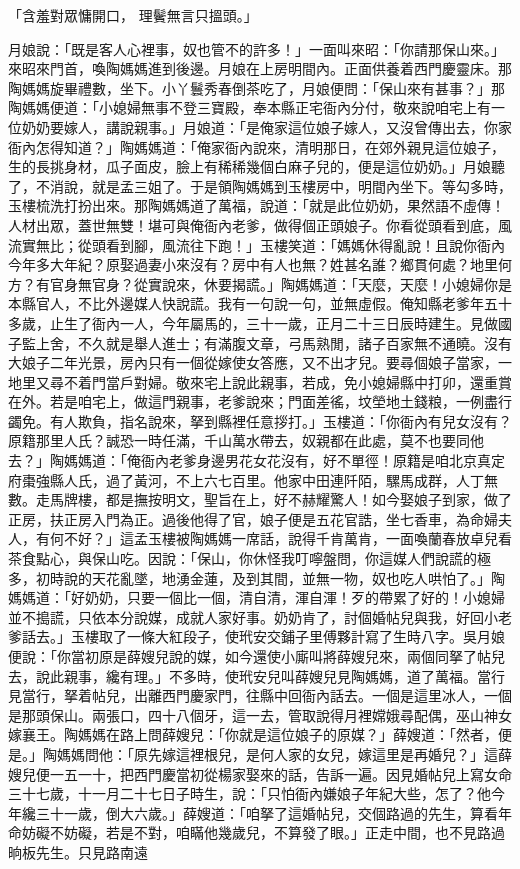 \begin{showcontents}{}
「含羞對眾慵開口，  理鬢無言只搵頭。」

月娘說：「既是客人心裡事，奴也管不的許多！」一面叫來昭：「你請那保山來。」來昭來門首，喚陶媽媽進到後邊。月娘在上房明間內。正面供養着西門慶靈床。那陶媽媽旋畢禮數，坐下。小丫鬟秀春倒茶吃了，月娘便問：「保山來有甚事？」那陶媽媽便道：「小媳婦無事不登三寶殿，奉本縣正宅衙內分付，敬來說咱宅上有一位奶奶要嫁人，講說親事。」月娘道：「是俺家這位娘子嫁人，又沒曾傳出去，你家衙內怎得知道？」陶媽媽道：「俺家衙內說來，清明那日，在郊外親見這位娘子，生的長挑身材，瓜子面皮，臉上有稀稀幾個白麻子兒的，便是這位奶奶。」月娘聽了，不消說，就是孟三姐了。于是領陶媽媽到玉樓房中，明間內坐下。等勾多時，玉樓梳洗打扮出來。那陶媽媽道了萬福，說道：「就是此位奶奶，果然語不虛傳！人材出眾，蓋世無雙！堪可與俺衙內老爹，做得個正頭娘子。你看從頭看到底，風流實無比；從頭看到腳，風流往下跑！」玉樓笑道：「媽媽休得亂說！且說你衙內今年多大年紀？原娶過妻小來沒有？房中有人也無？姓甚名誰？鄉貫何處？地里何方？有官身無官身？從實說來，休要揭謊。」陶媽媽道：「天麼，天麼！小媳婦你是本縣官人，不比外邊媒人快說謊。我有一句說一句，並無虛假。俺知縣老爹年五十多歲，止生了衙內一人，今年屬馬的，三十一歲，正月二十三日辰時建生。見做國子監上舍，不久就是舉人進士；有滿腹文章，弓馬熟閒，諸子百家無不通曉。沒有大娘子二年光景，房內只有一個從嫁使女答應，又不出才兒。要尋個娘子當家，一地里又尋不着門當戶對婦。敬來宅上說此親事，若成，免小媳婦縣中打卯，還重賞在外。若是咱宅上，做這門親事，老爹說來；門面差徭，坟塋地土錢粮，一例盡行蠲免。有人欺負，指名說來，拏到縣裡任意拶打。」玉樓道：「你衙內有兒女沒有？原籍那里人氏？誠恐一時任滿，千山萬水帶去，奴親都在此處，莫不也要同他去？」陶媽媽道：「俺衙內老爹身邊男花女花沒有，好不單徑！原籍是咱北京真定府棗強縣人氏，過了黃河，不上六七百里。他家中田連阡陌，騾馬成群，人丁無數。走馬牌樓，都是撫按明文，聖旨在上，好不赫耀驚人！如今娶娘子到家，做了正房，扶正房入門為正。過後他得了官，娘子便是五花官誥，坐七香車，為命婦夫人，有何不好？」這孟玉樓被陶媽媽一席話，說得千肯萬肯，一面喚蘭春放卓兒看茶食點心，與保山吃。因說：「保山，你休怪我叮嚀盤問，你這媒人們說謊的極多，初時說的天花亂墜，地湧金蓮，及到其間，並無一物，奴也吃人哄怕了。」陶媽媽道：「好奶奶，只要一個比一個，清自清，渾自渾！歹的帶累了好的！小媳婦並不搗謊，只依本分說媒，成就人家好事。奶奶肯了，討個婚帖兒與我，好回小老爹話去。」玉樓取了一條大紅段子，使玳安交鋪子里傅夥計寫了生時八字。吳月娘便說：「你當初原是薛嫂兒說的媒，如今還使小廝叫將薛嫂兒來，兩個同拏了帖兒去，說此親事，纔有理。」不多時，使玳安兒叫薛嫂兒見陶媽媽，道了萬福。當行見當行，拏着帖兒，出離西門慶家門，往縣中回衙內話去。一個是這里冰人，一個是那頭保山。兩張口，四十八個牙，這一去，管取說得月裡嫦娥尋配偶，巫山神女嫁襄王。陶媽媽在路上問薛嫂兒：「你就是這位娘子的原媒？」薛嫂道：「然者，便是。」陶媽媽問他：「原先嫁這裡根兒，是何人家的女兒，嫁這里是再婚兒？」這薛嫂兒便一五一十，把西門慶當初從楊家娶來的話，告訴一遍。因見婚帖兒上寫女命三十七歲，十一月二十七日子時生，說：「只怕衙內嫌娘子年紀大些，怎了？他今年纔三十一歲，倒大六歲。」薛嫂道：「咱拏了這婚帖兒，交個路過的先生，算看年命妨礙不妨礙，若是不對，咱瞞他幾歲兒，不算發了眼。」正走中間，也不見路過晌板先生。只見路南遠
\end{showcontents}

